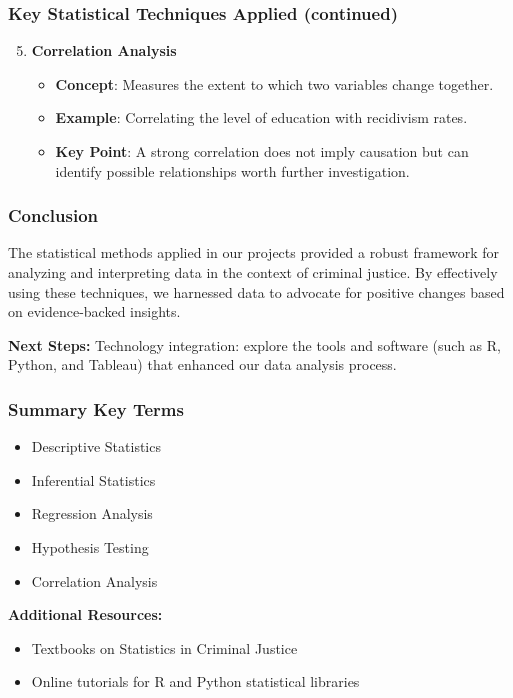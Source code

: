 \documentclass[aspectratio=169]{beamer}
\begin{document}
\begin{frame}[fragile]
    \frametitle{Key Statistical Techniques Applied (continued)}
    \begin{enumerate}
        \setcounter{enumi}{4} %
        \item \textbf{Correlation Analysis}
            \begin{itemize}
                \item \textbf{Concept}: Measures the extent to which two variables change together.
                \item \textbf{Example}: Correlating the level of education with recidivism rates.
                \item \textbf{Key Point}: A strong correlation does not imply causation but can identify possible relationships worth further investigation.
            \end{itemize}
    \end{enumerate}
\end{frame}

\begin{frame}[fragile]
    \frametitle{Conclusion}
    The statistical methods applied in our projects provided a robust framework for analyzing and interpreting data in the context of criminal justice. By effectively using these techniques, we harnessed data to advocate for positive changes based on evidence-backed insights.

    \textbf{Next Steps:} Technology integration: explore the tools and software (such as R, Python, and Tableau) that enhanced our data analysis process.
\end{frame}

\begin{frame}[fragile]
    \frametitle{Summary Key Terms}
    \begin{itemize}
        \item Descriptive Statistics
        \item Inferential Statistics
        \item Regression Analysis
        \item Hypothesis Testing
        \item Correlation Analysis
    \end{itemize}
    
    \textbf{Additional Resources:}
    \begin{itemize}
        \item Textbooks on Statistics in Criminal Justice
        \item Online tutorials for R and Python statistical libraries
    \end{itemize}
\end{frame}
\end{document}
